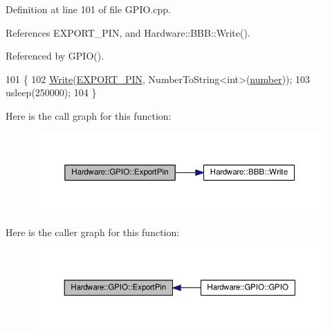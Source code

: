 Definition at line 101 of file G\+P\+I\+O.\+cpp.



References E\+X\+P\+O\+R\+T\+\_\+\+P\+I\+N, and Hardware\+::\+B\+B\+B\+::\+Write().



Referenced by G\+P\+I\+O().


\begin{DoxyCode}
101                                \{
102   \hyperlink{class_hardware_1_1_b_b_b_a155cc06f76d82a6b690ce5ea08e7c68e}{Write}(\hyperlink{_g_p_i_o_8h_a76065c2ed428f7d0b15d2cd8e494b857}{EXPORT\_PIN}, NumberToString<int>(\hyperlink{class_hardware_1_1_g_p_i_o_a1671a87bb70911b0a6a29019a068cf96}{number}));
103   usleep(250000);
104 \}
\end{DoxyCode}


Here is the call graph for this function\+:\nopagebreak
\begin{figure}[H]
\begin{center}
\leavevmode
\includegraphics[width=350pt]{class_hardware_1_1_g_p_i_o_a1a880bee633c9c5227cb36d2d6c63a52_cgraph}
\end{center}
\end{figure}




Here is the caller graph for this function\+:\nopagebreak
\begin{figure}[H]
\begin{center}
\leavevmode
\includegraphics[width=350pt]{class_hardware_1_1_g_p_i_o_a1a880bee633c9c5227cb36d2d6c63a52_icgraph}
\end{center}
\end{figure}


\hypertarget{class_hardware_1_1_g_p_i_o_a410f58faf97368fc9a1d76f3b44afbcb}{}
